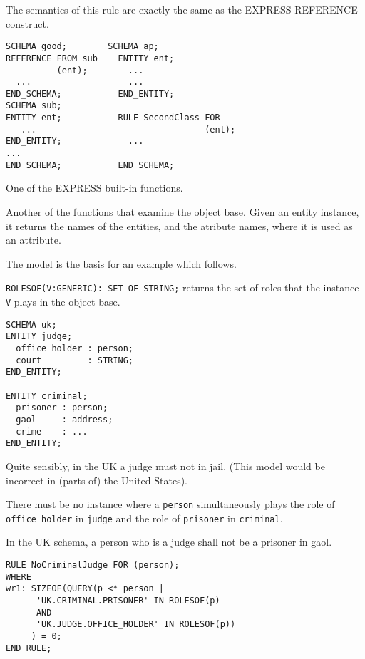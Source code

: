 \clearpage

    The semantics of this rule are exactly the same as the EXPRESS REFERENCE
construct.

\begin{verbatim}
SCHEMA good;        SCHEMA ap;
REFERENCE FROM sub    ENTITY ent;
          (ent);        ...
  ...                   ...
END_SCHEMA;           END_ENTITY;
SCHEMA sub;
ENTITY ent;           RULE SecondClass FOR
   ...                                 (ent);
END_ENTITY;             ...
...
END_SCHEMA;           END_SCHEMA;
\end{verbatim}


\begin{remarks}
\remintro
{}

    One of the EXPRESS built-in functions.

    Another of the functions that examine the object base. Given
an entity instance, it returns the names of the
entities, and the atribute names, where it is used as an attribute.


    The model is the basis for an example which follows.

\remend
\end{remarks}


\verb|ROLESOF(V:GENERIC): SET OF STRING;| returns the set of roles that the
instance \texttt{V} plays in the object base.

\begin{verbatim}
SCHEMA uk;
ENTITY judge;
  office_holder : person;
  court         : STRING;
END_ENTITY;

ENTITY criminal;
  prisoner : person;
  gaol     : address;
  crime    : ...
END_ENTITY;
\end{verbatim}

\begin{remarks}
\remintro
{}

    Quite sensibly, in the UK a judge must not in jail. (This
model would be incorrect in (parts of) the United States).

    There must be no instance where a \texttt{person} simultaneously
plays the role of \texttt{office\_holder} in \texttt{judge} and
the role of \texttt{prisoner} in \texttt{criminal}.

\remend
\end{remarks}

\clearpage

    In the UK schema, a person who is a judge shall not be a prisoner in gaol.
\begin{verbatim}
RULE NoCriminalJudge FOR (person);
WHERE
wr1: SIZEOF(QUERY(p <* person | 
      'UK.CRIMINAL.PRISONER' IN ROLESOF(p) 
      AND
      'UK.JUDGE.OFFICE_HOLDER' IN ROLESOF(p))
     ) = 0;
END_RULE;
\end{verbatim}


